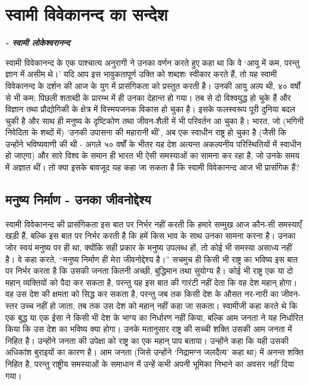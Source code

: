 
\chapter{स्वामी विवेकानन्द का सन्देश }

\begin{flushright}
\textit{\textbf{- स्वामी लोकेश्वरानन्द}}
\end{flushright}

स्वामी विवेकानन्द के एक पाश्चात्य अनुरागी ने उनका वर्णन करते हुए कहा था कि वे ‘आयु में कम, परन्तु ज्ञान में असीम थे।’ यदि आप इस भावुकतापूर्ण उक्ति को शब्दशः स्वीकार करते हैं, तो यह स्वामी विवेकानन्द के दर्शन की आज के युग में प्रासंगिकता को प्रस्तुत करती है। उनकी आयु अल्प थी, ४० वर्षों से भी कम; पिछली शताब्दी के प्रारम्भ में ही उनका देहान्त हो गया। तब से दो विश्वयुद्ध हो चुके हैं और विज्ञान तथा प्रौद्योगिकी के क्षेत्र में विस्मयजनक विकास हो चुका है। इसके फलस्वरूप पूरी दुनिया बदल चुकी है और साथ ही मनुष्य के दृष्टिकोण तथा जीवन-शैली में भी परिवर्तन आ चुका है। भारत, जो (भगिनी निवेदिता के शब्दों में) ‘उनकी उपासना की महारानी थीं’, अब एक स्वाधीन राष्ट्र हो चुका है (जैसी कि उन्होंने भविष्यवाणी की थी - अगले ५० वर्षों के भीतर यह देश अत्यन्त अकल्पनीय परिस्थितियों में स्वाधीन हो जाएगा) और सारे विश्व के समान ही भारत भी ऐसी समस्याओं का सामना कर रहा है, जो उनके समय में अज्ञात थीं। तो क्या इसके बावजूद यह कहा जा सकता है कि स्वामी विवेकानन्द आज भी प्रासंगिक हैं?

\section*{मनुष्य निर्माण - उनका जीवनोद्देश्य}

स्वामी विवेकानन्द की प्रासंगिकता इस बात पर निर्भर नहीं करती कि हमारे सम्मुख आज कौन-सी समस्याएँ खड़ी हैं, बल्कि इस बात पर निर्भर करती है कि हमें किस भाव के साथ उनका सामना करना है। उनका जोर स्वयं मनुष्य पर ही था, क्योंकि सही प्रकार के मनुष्य उपलब्ध हों, तो कोई भी समस्या असाध्य नहीं है। वे कहा करते, “मनुष्य निर्माण ही मेरा जीवनोद्देश्य है।” सचमुच ही किसी भी राष्ट्र का भविष्य इस बात पर निर्भर करता है कि उसकी जनता कितनी अच्छी, बुद्धिमान तथा सुयोग्य है। कोई भी राष्ट्र एक या दो महान् व्यक्तियों को पैदा कर सकता है, परन्तु यह इस बात की गारंटी नहीं देता कि वह देश महान् होगा। वह उस देश की क्षमता को सिद्ध कर सकता है, परन्तु जब तक किसी देश के औसत नर-नारी का जीवन-स्तर उच्च नहीं हो जाता, तब तक उस देश को महान् नहीं कहा जा सकता। स्वामीजी कहा करते थे कि एक बुद्ध या एक ईसा ने किसी भी देश के भाग्य का निर्धारण नहीं किया, बल्कि आम जनता ने यह निर्धारित किया कि उस देश का भविष्य क्या होगा। उनके मतानुसार राष्ट्र की सच्ची शक्ति उसकी आम जनता में निहित है। उन्होंने जनता की उपेक्षा को राष्ट्र का एक महान् पाप बताया। उन्होंने कहा कि यही उसकी अधिकांश बुराइयों का कारण है। आम जनता (जिसे उन्होंने ‘निद्रामग्न जलदैत्य’ कहा था) में अनन्त शक्ति निहित है, परन्तु राष्ट्रीय समस्याओं के समाधान में उन्हें कभी अपनी भूमिका निभाने का अवसर नहीं दिया गया। 

